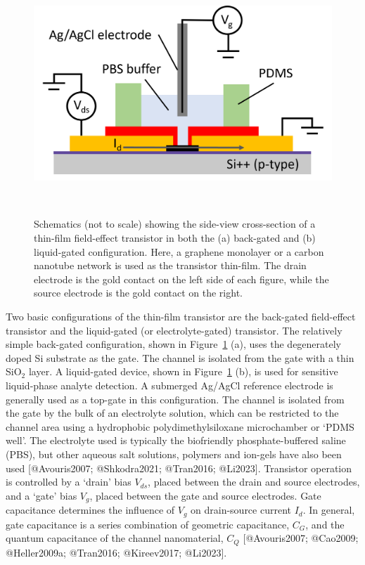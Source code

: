 \documentclass[
  letterpaper,
  DIV=11,
  numbers=noendperiod]{scrartcl}
\begin{document}
\begin{figure}
%
\begin{minipage}{0.01\linewidth}
~\end{minipage}%
%
\begin{minipage}{0.45\linewidth}
\includegraphics{figures/ch2/liquid-gate-schematic.png}\end{minipage}%
%
\begin{minipage}{0.01\linewidth}
~\end{minipage}%

\caption{\label{fig-gating-schematics}Schematics (not to scale) showing
the side-view cross-section of a thin-film field-effect transistor in
both the (a) back-gated and (b) liquid-gated configuration. Here, a
graphene monolayer or a carbon nanotube network is used as the
transistor thin-film. The drain electrode is the gold contact on the
left side of each figure, while the source electrode is the gold contact
on the right.}

\end{figure}%

Two basic configurations of the thin-film transistor are the back-gated
field-effect transistor and the liquid-gated (or electrolyte-gated)
transistor. The relatively simple back-gated configuration, shown in
Figure~\ref{fig-gating-schematics} (a), uses the degenerately doped Si
substrate as the gate. The channel is isolated from the gate with a thin
SiO\(_2\) layer. A liquid-gated device, shown in
Figure~\ref{fig-gating-schematics} (b), is used for sensitive
liquid-phase analyte detection. A submerged Ag/AgCl reference electrode
is generally used as a top-gate in this configuration. The channel is
isolated from the gate by the bulk of an electrolyte solution, which can
be restricted to the channel area using a hydrophobic
polydimethylsiloxane microchamber or `PDMS well'. The electrolyte used
is typically the biofriendly phosphate-buffered saline (PBS), but other
aqueous salt solutions, polymers and ion-gels have also been used
{[}@Avouris2007; @Shkodra2021; @Tran2016; @Li2023{]}. Transistor
operation is controlled by a `drain' bias \(V_{ds}\), placed between the
drain and source electrodes, and a `gate' bias \(V_g\), placed between
the gate and source electrodes. Gate capacitance determines the
influence of \(V_g\) on drain-source current \(I_d\). In general, gate
capacitance is a series combination of geometric capacitance, \(C_{G}\),
and the quantum capacitance of the channel nanomaterial, \(C_{Q}\)
{[}@Avouris2007; @Cao2009; @Heller2009a; @Tran2016; @Kireev2017;
@Li2023{]}.
\end{document}
